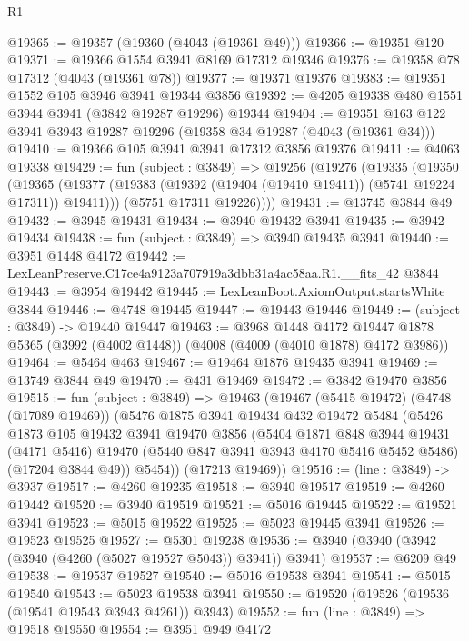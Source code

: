 \begin{lexlean}{R1}
\begin{coremodule}
@19365 := @19357 (@19360 (@4043 (@19361 @49)))
@19366 := @19351 @120
@19371 := @19366 @1554 @3941 @8169 @17312 @19346
@19376 := @19358 @78 @17312 (@4043 (@19361 @78))
@19377 := @19371 @19376
@19383 := @19351 @1552 @105 @3946 @3941 @19344 @3856
@19392 := @4205 @19338 @480 @1551 @3944 @3941 (@3842 @19287 @19296) @19344
@19404 := @19351 @163 @122 @3941 @3943 @19287 @19296 (@19358 @34 @19287 (@4043 (@19361 @34)))
@19410 := @19366 @105 @3941 @3941 @17312 @3856 @19376
@19411 := @4063 @19338
@19429 := fun (subject : @3849) =>
  @19256
    (@19276
      (@19335
        (@19350
          (@19365 (@19377 (@19383 (@19392 (@19404 (@19410 @19411)) (@5741 @19224 @17311)) @19411)))
          (@5751 @17311 @19226))))
@19431 := @13745 @3844 @49
@19432 := @3945 @19431
@19434 := @3940 @19432 @3941
@19435 := @3942 @19434
@19438 := fun (subject : @3849) => @3940 @19435 @3941
@19440 := @3951 @1448 @4172
@19442 := LexLeanPreserve.C17ce4a9123a707919a3dbb31a4ac58aa.R1.__fits_42 @3844
@19443 := @3954 @19442
@19445 := LexLeanBoot.AxiomOutput.startsWhite @3844
@19446 := @4748 @19445
@19447 := @19443 @19446
@19449 := (subject : @3849) -> @19440 @19447
@19463 := @3968
    @1448
    @4172
    @19447
    @1878
    @5365
    (@3992 (@4002 @1448))
    (@4008 (@4009 (@4010 @1878) @4172 @3986))
@19464 := @5464 @463
@19467 := @19464 @1876 @19435 @3941
@19469 := @13749 @3844 @49
@19470 := @431 @19469
@19472 := @3842 @19470 @3856
@19515 := fun (subject : @3849) =>
  @19463
    (@19467
      (@5415 @19472)
      (@4748 (@17089 @19469))
      (@5476
        @1875
        @3941
        @19434
        @432
        @19472
        @5484
        (@5426
          @1873
          @105
          @19432
          @3941
          @19470
          @3856
          (@5404
            @1871
            @848
            @3944
            @19431
            (@4171 @5416)
            @19470
            (@5440 @847 @3941 @3943 @4170 @5416 @5452 @5486)
            (@17204 @3844 @49))
          @5454))
      (@17213 @19469))
@19516 := (line : @3849) -> @3937
@19517 := @4260 @19235
@19518 := @3940 @19517
@19519 := @4260 @19442
@19520 := @3940 @19519
@19521 := @5016 @19445
@19522 := @19521 @3941
@19523 := @5015 @19522
@19525 := @5023 @19445 @3941
@19526 := @19523 @19525
@19527 := @5301 @19238
@19536 := @3940 (@3940 (@3942 (@3940 (@4260 (@5027 @19527 @5043)) @3941)) @3941)
@19537 := @6209 @49
@19538 := @19537 @19527
@19540 := @5016 @19538 @3941
@19541 := @5015 @19540
@19543 := @5023 @19538 @3941
@19550 := @19520 (@19526 (@19536 (@19541 @19543 @3943 @4261)) @3943)
@19552 := fun (line : @3849) => @19518 @19550
@19554 := @3951 @949 @4172

\end{coremodule}
\end{lexlean}
